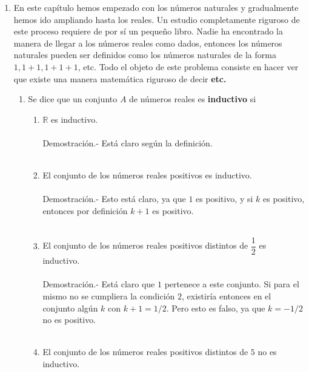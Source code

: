 \begin{enumerate}[\bfseries 1.]
       \item En este capítulo hemos empezado con los números naturales y gradualmente hemos ido ampliando hasta los reales. Un estudio completamente riguroso de este proceso requiere de por sí un pequeño libro. Nadie ha encontrado la manera de llegar a los números reales como dados, entonces los números naturales pueden ser definidos como los números naturales de la forma $1,1+1,1+1+1$, etc. Todo el objeto de este problema consiste en hacer ver que existe una manera matemática riguroso de decir \textbf{etc.} 
          \begin{enumerate}[\bfseries (a)]
             \item Se dice que un conjunto $A$ de números reales es \textbf{inductivo} si
                \begin{enumerate}[\bfseries (i)]
                   \item $\mathbb{R}$ es inductivo.\\\\
                      Demostración.-\;  Está claro según la definición.\\\\
                   \item El conjunto de los números reales positivos es inductivo.\\\\
                      Demostración.-\; Esto está claro, ya que $1$ es positivo, y si $k$ es positivo, entonces por definición $k+1$ es positivo.\\\\
                   \item El conjunto de los números reales positivos distintos de $\dfrac{1}{2}$ es inductivo.\\\\
                      Demostración.-\; Está claro que $1$ pertenece a este conjunto. Si para el mismo no se cumpliera la condición $2$, existiría entonces en el conjunto algún $k$ con $k+1=1/2$. Pero esto es falso, ya que $k=-1/2$ no es positivo.\\\\
                   \item El conjunto de los números reales positivos distintos de $5$ no es inductivo.\\\\

\end{enumerate}
\end{enumerate}
\end{enumerate}
